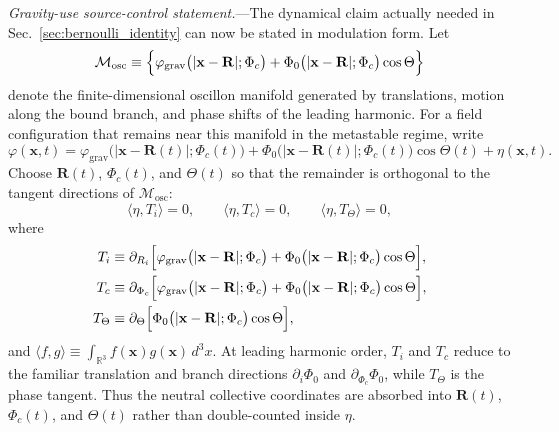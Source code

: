 \documentclass[aps,prd,onecolumn,superscriptaddress,nofootinbib,showpacs,12pt,notitlepage]{revtex4-2}
\begin{document}
\textit{Gravity-use source-control statement.}---The dynamical claim
actually needed in Sec.~\ref{sec:bernoulli_identity} can now be
stated in modulation form.  Let
\begin{equation}\label{eq:oscillon_manifold}
  \mathcal{M}_{\mathrm{osc}}
  \equiv \Bigl\{
    \varphi_{\mathrm{grav}}\bigl(|\mathbf{x}-\mathbf{R}|;\Phi_c\bigr)
    + \Phi_0\bigl(|\mathbf{x}-\mathbf{R}|;\Phi_c\bigr)\cos\Theta
  \Bigr\}
\end{equation}
denote the finite-dimensional oscillon manifold generated by
translations, motion along the bound branch, and phase shifts of the
leading harmonic.  For a field configuration that remains near this
manifold in the metastable regime, write
\begin{equation}\label{eq:modulated_source_decomposition}
  \varphi(\mathbf{x},t)
  = \varphi_{\mathrm{grav}}
      \bigl(|\mathbf{x}-\mathbf{R}(t)|;\Phi_c(t)\bigr)
  + \Phi_0\bigl(|\mathbf{x}-\mathbf{R}(t)|;\Phi_c(t)\bigr)\cos\Theta(t)
  + \eta(\mathbf{x},t).
\end{equation}
Choose $\mathbf{R}(t)$, $\Phi_c(t)$, and $\Theta(t)$ so that the
remainder is orthogonal to the tangent directions of
$\mathcal{M}_{\mathrm{osc}}$:
\begin{equation}\label{eq:source_orthogonality}
  \langle \eta, T_i \rangle = 0,\qquad
  \langle \eta, T_c \rangle = 0,\qquad
  \langle \eta, T_\Theta \rangle = 0,
\end{equation}
where
\begin{align}
  T_i &\equiv \partial_{R_i}\Bigl[
    \varphi_{\mathrm{grav}}\bigl(|\mathbf{x}-\mathbf{R}|;\Phi_c\bigr)
    + \Phi_0\bigl(|\mathbf{x}-\mathbf{R}|;\Phi_c\bigr)\cos\Theta
  \Bigr],\\
  T_c &\equiv \partial_{\Phi_c}\Bigl[
    \varphi_{\mathrm{grav}}\bigl(|\mathbf{x}-\mathbf{R}|;\Phi_c\bigr)
    + \Phi_0\bigl(|\mathbf{x}-\mathbf{R}|;\Phi_c\bigr)\cos\Theta
  \Bigr],\\
  T_\Theta &\equiv \partial_\Theta\Bigl[
    \Phi_0\bigl(|\mathbf{x}-\mathbf{R}|;\Phi_c\bigr)\cos\Theta
  \Bigr],
\end{align}
and $\langle f,g\rangle \equiv \int_{\mathbb{R}^3}
f(\mathbf{x})g(\mathbf{x})\,d^3x$.  At leading harmonic order,
$T_i$ and $T_c$ reduce to the familiar translation and branch
directions $\partial_i\Phi_0$ and $\partial_{\Phi_c}\Phi_0$, while
$T_\Theta$ is the phase tangent.  Thus the neutral collective
coordinates are absorbed into $\mathbf{R}(t)$, $\Phi_c(t)$, and
$\Theta(t)$ rather than double-counted inside $\eta$.
\end{document}
